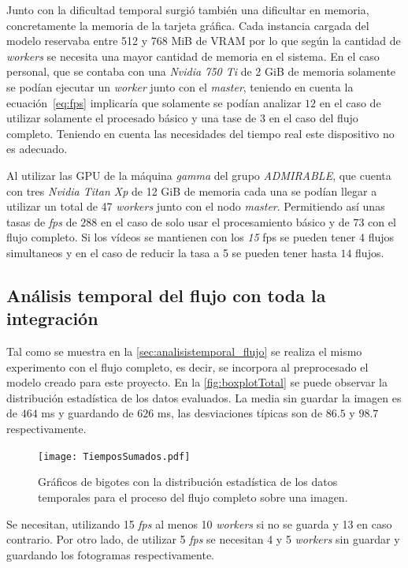 Junto con la dificultad temporal surgió también una dificultar en memoria, concretamente la memoria de la tarjeta gráfica. Cada instancia cargada del modelo reservaba entre 512 y 768 MiB de VRAM por lo que según la cantidad de \textit{workers} se necesita una mayor cantidad de memoria en el sistema. En el caso personal, que se contaba con una \textit{Nvidia 750 Ti} de 2 GiB de memoria solamente se podían ejecutar un \textit{worker} junto con el \textit{master}, teniendo en cuenta la ecuación~\ref{eq:fps} implicaría que solamente se podían analizar $12$ en el caso de utilizar solamente el procesado básico y una tase de $3$ en el caso del flujo completo. Teniendo en cuenta las necesidades del tiempo real este dispositivo no es adecuado.

Al utilizar las GPU de la máquina \textit{gamma} del grupo \textit{ADMIRABLE}, que cuenta con tres \textit{Nvidia Titan Xp} de 12 GiB de memoria cada una se podían llegar a utilizar un total de 47 \textit{workers} junto con el nodo \textit{master}. Permitiendo así unas tasas de \textit{fps} de $288$ en el caso de solo usar el procesamiento básico y de $73$ con el flujo completo. Si los vídeos se mantienen con los \textit{15} fps se pueden tener $4$ flujos simultaneos y en el caso de reducir la tasa a 5 se pueden tener hasta $14$ flujos.


\subsection{Análisis temporal del flujo con toda la integración}\label{sec:analisistemporal}

Tal como se muestra en la \autoref{sec:analisistemporal_flujo} se realiza el mismo experimento con el flujo completo, es decir, se incorpora al preprocesado el modelo creado para este proyecto. En la \autoref{fig:boxplotTotal} se puede observar la distribución estadística de los datos evaluados. La media sin guardar la imagen es de $464$ ms y guardando de $626$ ms, las desviaciones típicas son de $86.5$ y $98.7$ respectivamente.

\begin{figure}[h]
	\texttt{[image: TiemposSumados.pdf]}
	\caption{Gráficos de bigotes con la distribución estadística de los datos temporales para el proceso del flujo completo sobre una imagen.}
	\label{fig:boxplotTotal}
\end{figure}

Se necesitan, utilizando 15 \textit{fps} al menos 10 \textit{workers} si no se guarda y 13 en caso contrario. Por otro lado, de utilizar 5 \textit{fps} se necesitan 4 y 5 \textit{workers} sin guardar y guardando los fotogramas respectivamente.